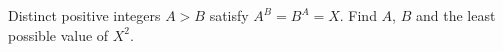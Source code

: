 Distinct positive integers $A>B$ satisfy $A^B=B^A=X$. Find $A$, $B$ and the least possible value of $X^2$.
